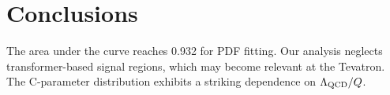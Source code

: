 \section{Conclusions}\label{sec:conclusions}

The area under the curve reaches 0.932 for PDF fitting. Our analysis
neglects transformer-based signal regions, which may become relevant at
the Tevatron. The C-parameter distribution exhibits a striking
dependence on $\Lambda_{\rm QCD}/Q$.


